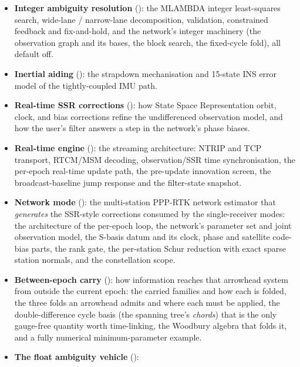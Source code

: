 \documentclass[11pt,letterpaper]{article}
\begin{document}
\begin{itemize}[leftmargin=*]
      linear-combination test statistics (Melbourne--W\"ubbena,
      geometry-free, GRAPHIC, extra-wide-lane, ionosphere-free time
      difference), the network's slip layer and its slip funnel, and the
      TurboEdit $2\times2$ integer repair.
\item \textbf{Integer ambiguity resolution} (): the
      \textsc{MLAMBDA} integer least-squares search, wide-lane /
      narrow-lane decomposition, validation, constrained feedback and
      fix-and-hold, and the network's integer machinery (the observation
      graph and its bases, the block search, the fixed-cycle fold), all
      default off.
\item \textbf{Inertial aiding} (): the strapdown
      mechanisation and 15-state INS error model of the tightly-coupled
      IMU path.
\item \textbf{Real-time SSR corrections} (): how State
      Space Representation orbit, clock, and bias corrections refine the
      undifferenced observation model, and how the user's filter answers
      a step in the network's phase biases.
\item \textbf{Real-time engine} (): the streaming
      architecture: NTRIP and TCP transport, RTCM/MSM decoding,
      observation/SSR time synchronisation, the per-epoch real-time
      update path, the pre-update innovation screen, the
      broadcast-baseline jump response and the filter-state snapshot.
\item \textbf{Network mode} (): the multi-station
      PPP-RTK network estimator that \emph{generates} the SSR-style
      corrections consumed by the single-receiver modes: the
      architecture of the per-epoch loop, the network's parameter set
      and joint observation model, the S-basis datum and its clock,
      phase and satellite code-bias parts, the rank gate, the
      per-station Schur reduction with exact sparse station normals,
      and the constellation scope.
\item \textbf{Between-epoch carry} (): how
      information reaches that arrowhead system from outside the
      current epoch: the carried families and how each is folded, the
      three folds an arrowhead admits and where each
      must be applied, the double-difference cycle basis (the spanning
      tree's \emph{chords}) that is the only gauge-free quantity worth
      time-linking, the Woodbury algebra that folds it, and a fully
      numerical minimum-parameter example.
\item \textbf{The float ambiguity vehicle} ():

\end{itemize}
\end{document}
